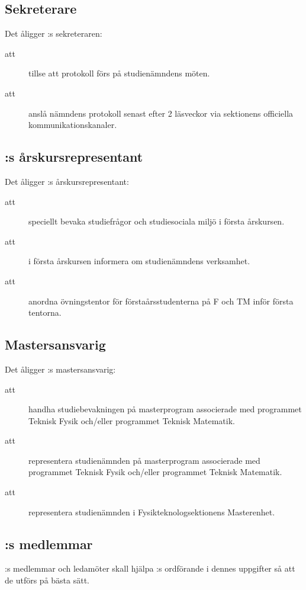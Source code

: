 \subsection{Sekreterare}
Det åligger \forening:s sekreteraren:
\begin{description}
    \item[att] tillse att protokoll förs på studienämndens möten.
    \item[att] anslå nämndens protokoll senast efter 2 läsveckor via sektionens officiella kommunikationskanaler. 
\end{description}

\subsection{\forening :s årskursrepresentant}
    Det åligger \forening:s årskursrepresentant:
\begin{description}
      \item[att] speciellt bevaka studiefrågor och studiesociala miljö i första årskursen.
      \item[att] i första årskursen informera om studienämndens verksamhet.
      \item[att] anordna övningstentor för förstaårsstudenterna på F och TM inför första tentorna.
\end{description}

\subsection{Mastersansvarig}
Det åligger \forening:s mastersansvarig:
\begin{description}
      \item [att] handha studiebevakningen på masterprogram
      associerade med programmet Teknisk Fysik och/eller programmet Teknisk Matematik.
      \item [att] representera studienämnden på masterprogram associerade med
      programmet Teknisk Fysik och/eller programmet Teknisk Matematik.
      \item [att] representera studienämnden i Fysikteknologsektionens Masterenhet.
\end{description}
    

\subsection{\forening :s medlemmar}
\forening:s medlemmar och ledamöter skall hjälpa \forening:s ordförande i dennes uppgifter så att de utförs på bästa sätt.

